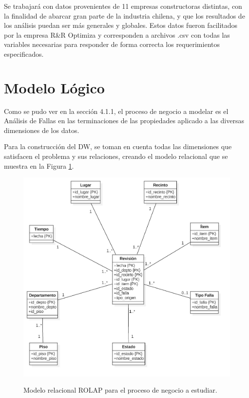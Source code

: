 \documentclass[letter,12pt,oneside]{report}
\begin{document}
Se trabajará con datos provenientes de 11 empresas constructoras distintas, con la finalidad de abarcar gran parte de la industria chilena, y que los resultados de los análisis puedan ser más generales y globales. Estos datos fueron facilitados por la empresa R\&R Optimiza y corresponden a archivos .csv con todas las variables necesarias para responder de forma correcta los requerimientos especificados.

\section{Modelo Lógico}
Como se pudo ver en la sección 4.1.1, el proceso de negocio a modelar es el Análisis de Fallas en las terminaciones de las propiedades aplicado a las diversas dimensiones de los datos.

Para la construcción del DW, se toman en cuenta todas las dimensiones que satisfacen el problema y sus relaciones, creando el modelo relacional que se muestra en la Figura \ref{rolap}.

\begin{figure}[H]
\begin{center}
\includegraphics[scale=0.4]{images/Main2.jpg}
\caption{Modelo relacional ROLAP para el proceso de negocio a estudiar.}
\label{rolap}
\end{center}
\end{figure}
\end{document}
